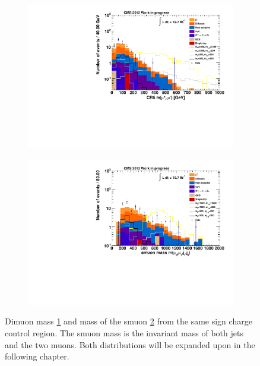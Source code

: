 \begin{figure}[htb!]
  \centering
  \begin{subfigure}[b]{0.495\textwidth}
    \centering
    \includegraphics[width=\textwidth]{plots/CR6_m_mumu_nofakes.pdf}
    \caption{\label{fig:CRBVC_m_mumu_nofakes}}
  \end{subfigure}
  \begin{subfigure}[b]{0.495\textwidth}
    \centering
    \includegraphics[width=\textwidth]{plots/CR6_m_smuon_nofakes.pdf}
    \caption{\label{fig:CRBVC_m_smuon_nofakes}}
  \end{subfigure}
  \caption{Dimuon mass \ref{fig:CRBVC_m_mumu_nofakes} and mass of the smuon \ref{fig:CRBVC_m_smuon_nofakes} from the same sign charge control region. The smuon mass is the invariant mass of both jets and the two muons. Both distributions will be expanded upon in the following chapter.}
  \label{fig:ssccr_nofakes}
\end{figure}

